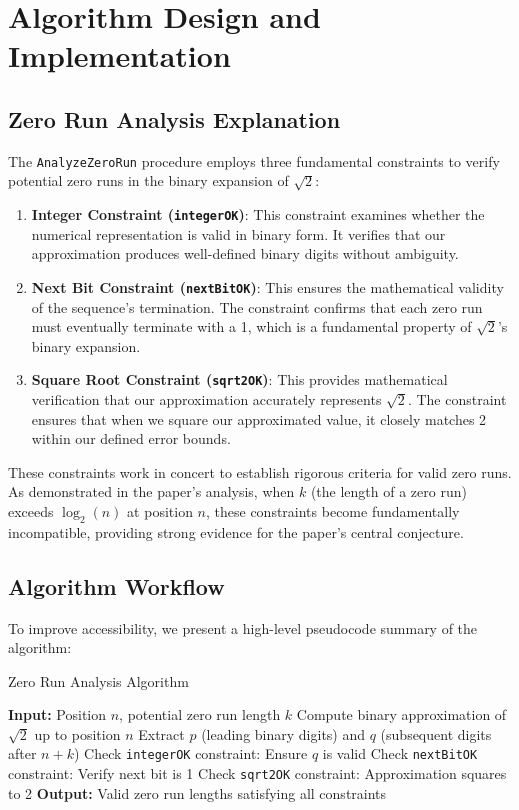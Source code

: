 \section{Algorithm Design and Implementation}

\subsection{Zero Run Analysis Explanation}
The \texttt{AnalyzeZeroRun} procedure employs three fundamental constraints to verify potential
zero runs in the binary expansion of $\sqrt{2}$:
\begin{enumerate}
    \item \textbf{Integer Constraint (\texttt{integerOK})}: This constraint examines whether the numerical
    representation is valid in binary form. It verifies that our approximation produces
    well-defined binary digits without ambiguity.
    \item \textbf{Next Bit Constraint (\texttt{nextBitOK})}: This ensures the mathematical validity of the
    sequence’s termination. The constraint confirms that each zero run must eventually
    terminate with a 1, which is a fundamental property of $\sqrt{2}$’s binary expansion.
    \item \textbf{Square Root Constraint (\texttt{sqrt2OK})}: This provides mathematical verification that
    our approximation accurately represents $\sqrt{2}$. The constraint ensures that when we
    square our approximated value, it closely matches 2 within our defined error bounds.
\end{enumerate}

These constraints work in concert to establish rigorous criteria for valid zero runs. As
demonstrated in the paper’s analysis, when $k$ (the length of a zero run) exceeds $\log_2(n)$ at
position $n$, these constraints become fundamentally incompatible, providing strong evidence
for the paper’s central conjecture.

\subsection{Algorithm Workflow}
To improve accessibility, we present a high-level pseudocode summary of the algorithm:

\begin{algorithm}[H]
\caption{Zero Run Analysis Algorithm}
\begin{algorithmic}[1]
\State \textbf{Input:} Position $n$, potential zero run length $k$
\State Compute binary approximation of $\sqrt{2}$ up to position $n$
\State Extract $p$ (leading binary digits) and $q$ (subsequent digits after $n+k$)
    \State Check \texttt{integerOK} constraint: Ensure $q$ is valid
    \State Check \texttt{nextBitOK} constraint: Verify next bit is 1
    \State Check \texttt{sqrt2OK} constraint: Approximation squares to 2
\EndFor
\State \textbf{Output:} Valid zero run lengths satisfying all constraints
\end{algorithmic}
\end{algorithm}

